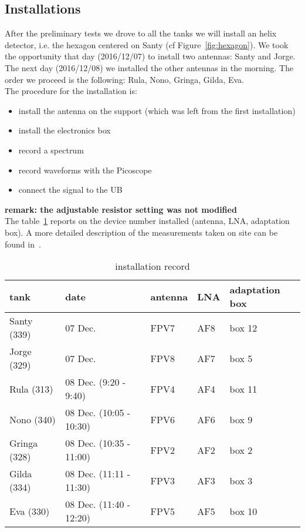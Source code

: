 \subsection{Installations}
After the preliminary tests we drove  to all the tanks we will install
an  helix   detector,  i.e.   the   hexagon  centered  on   Santy  (cf
Figure~\ref{fig:hexagon}).    We  took   the   opportunity  that   day
(2016/12/07) to  install two antennas:  Santy and Jorge. The  next day
(2016/12/08) we installed the other antennas in the morning. The order
we proceed  is the  following: Rula, Nono,  Gringa, Gilda,  Eva.\\ The
procedure for the installation is:
\begin{itemize}
\item install the antenna on the support (which was left from the first installation)
\item install the electronics box
\item record a spectrum
\item record waveforms with the Picoscope
\item connect the signal to the UB
\end{itemize}
\textbf{remark:    the   adjustable    resistor   setting    was   not
  modified}\\  The  table~\ref{tab:boxnumber}  reports on  the  device
number  installed (antenna,  LNA,  adaptation box).   A more  detailed
description  of   the  measurements  taken   on  site  can   be  found
in~\cite{measurementsdec2016}.
\begin{table}[!h]
\centering
\caption{installation record}
\label{tab:boxnumber}
\begin{tabular}{ |l|l|l|l|l| }
\hline
tank & date & antenna & LNA & adaptation box \\ \hline \hline
Santy (339) & 07 Dec. & FPV7 & AF8 & box 12 \\ \hline
Jorge (329) & 07 Dec. & FPV8 & AF7 & box 5 \\ \hline
Rula (313) & 08 Dec. (9:20 - 9:40) & FPV4 & AF4 & box 11 \\ \hline
Nono (340) & 08 Dec. (10:05 - 10:30) & FPV6 & AF6 & box 9 \\ \hline
Gringa (328) & 08 Dec. (10:35 - 11:00) & FPV2 & AF2 & box 2 \\ \hline
Gilda (334) & 08 Dec. (11:11 - 11:30) & FPV3 & AF3 & box 3 \\ \hline
Eva (330) & 08 Dec. (11:40 - 12:20) & FPV5 & AF5 & box 10 \\ \hline
\end{tabular}
\end{table}
